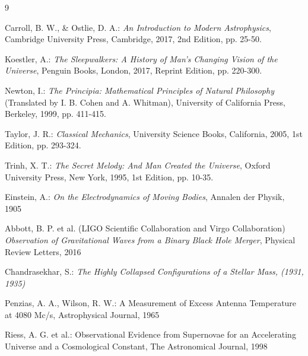 \documentclass[10pt,a4paper]{article}
\begin{document}
\clearpage
{}
{}
\renewcommand{\refname}{References}
\begin{thebibliography}{9}

Carroll, B. W., \& Ostlie, D. A.: \textit{An Introduction to Modern Astrophysics}, Cambridge University Press, Cambridge, 2017, 2nd Edition, pp. 25-50.

Koestler, A.: \textit{The Sleepwalkers: A History of Man's Changing Vision of the Universe}, Penguin Books, London, 2017, Reprint Edition, pp. 220-300.

Newton, I.: \textit{The Principia: Mathematical Principles of Natural Philosophy} (Translated by I. B. Cohen and A. Whitman), University of California Press, Berkeley, 1999, pp. 411-415.

Taylor, J. R.: \textit{Classical Mechanics}, University Science Books, California, 2005, 1st Edition, pp. 293-324.

Trinh, X. T.: \textit{The Secret Melody: And Man Created the Universe}, Oxford University Press, New York, 1995, 1st Edition, pp. 10-35.

Einstein, A.: \textit{On the Electrodynamics of Moving Bodies}, Annalen der Physik, 1905

Abbott, B. P. et al. (LIGO Scientific Collaboration and Virgo Collaboration) \textit{Observation of Gravitational Waves from a Binary Black Hole Merger}, Physical Review Letters, 2016

Chandrasekhar, S.: \textit{The Highly Collapsed Configurations of a Stellar Mass, (1931, 1935)}

Penzias, A. A.,  Wilson, R. W.: A Measurement of Excess Antenna Temperature at 4080 Mc/s, Astrophysical Journal, 1965

Riess, A. G. et al.: Observational Evidence from Supernovae for an Accelerating Universe and a Cosmological Constant, The Astronomical Journal, 1998

\end{thebibliography}



\end{document}
